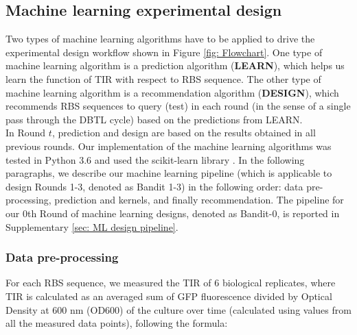 \subsection{Machine learning experimental design}

Two types of machine learning algorithms have to be applied to drive the experimental design workflow shown in Figure \ref{fig: Flowchart}.
One type of machine learning algorithm is a prediction algorithm (\textbf{LEARN}), which helps us learn the function of TIR with respect to RBS sequence. The other type of machine learning algorithm is a recommendation algorithm (\textbf{DESIGN}), which recommends RBS sequences to query (test) in each round (in the sense of a single pass through the DBTL cycle) based on the predictions from LEARN. \\

In Round $t$, prediction and design are based on the results obtained in all previous rounds. 
Our implementation of the machine learning algorithms was tested in Python 3.6 and used the scikit-learn library \cite{scikit-learn}. 
In the following paragraphs, we describe our machine learning pipeline (which is applicable to design Rounds 1-3, denoted as Bandit 1-3) in the following order: data pre-processing, prediction and kernels, and finally recommendation. 
The pipeline for our 0th Round of machine learning designs, denoted as Bandit-0, is reported in Supplementary \ref{sec: ML design pipeline}.


\subsubsection{Data pre-processing}
\label{sec: method data pre-procesing}

For each RBS sequence, we measured the TIR of 6 biological replicates, where TIR is calculated as an averaged sum of GFP fluorescence divided by Optical Density at 600 nm (OD600) of the culture over time (calculated using values from all the measured data points), following the formula:

